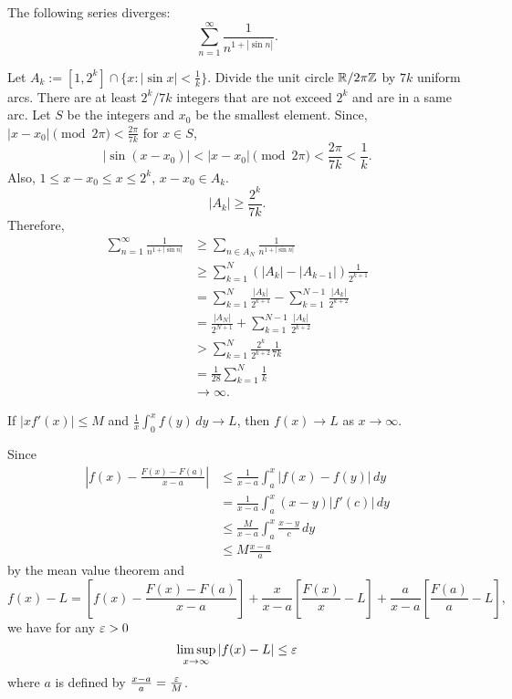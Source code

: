 \documentclass[12pt]{article}
\begin{document}
\begin{prb}
The following series diverges: \[\sum_{n=1}^\infty\frac1{n^{1+|\sin n|}}.\]
\end{prb}
\begin{sol}
Let $A_k:=[1,2^k]\cap\{x:|\sin x|<\frac1k\}$.
Divide the unit circle $\mathbb{R}/2\pi\mathbb{Z}$ by $7k$ uniform arcs.
There are at least $2^k/7k$ integers that are not exceed $2^k$ and are in a same arc.
Let $S$ be the integers and $x_0$ be the smallest element.
Since, $|x-x_0|\pmod{2\pi}<\frac{2\pi}{7k}$ for $x\in S$,
\[|\sin(x-x_0)|<|x-x_0|\pmod{2\pi}<\frac{2\pi}{7k}<\frac1k.\]
Also, $1\le x-x_0\le x\le2^k$, $x-x_0\in A_k$.
\[|A_k|\ge\frac{2^k}{7k}.\]
Therefore,
\begin{align*}
\sum_{n=1}^\infty\frac1{n^{1+|\sin n|}}
&\ge\sum_{n\in A_N}\frac1{n^{1+|\sin n|}}\\
&\ge\sum_{k=1}^N(|A_k|-|A_{k-1}|)\frac1{2^{k+1}}\\
&=\sum_{k=1}^N\frac{|A_k|}{2^{k+1}}-\sum_{k=1}^{N-1}\frac{|A_k|}{2^{k+2}}\\
&=\frac{|A_N|}{2^{N+1}}+\sum_{k=1}^{N-1}\frac{|A_k|}{2^{k+2}}\\
&>\sum_{k=1}^N\frac{2^k}{2^{k+2}}\frac1{7k}\\
&=\frac1{28}\sum_{k=1}^N\frac1k\\
&\to\infty.
\end{align*}
\end{sol}

\clearpage
\begin{prb}
If $|xf'(x)|\le M$ and $\frac1x\int_0^xf(y)\,dy\to L$, then $f(x)\to L$ as $x\to\infty$.
\end{prb}
\begin{sol}
Since
\begin{align*}
|f(x)-\frac{F(x)-F(a)}{x-a}|
&\le\frac1{x-a}\int_a^x|f(x)-f(y)|\,dy\\
&=\frac1{x-a}\int_a^x(x-y)|f'(c)|\,dy\\
&\le\frac M{x-a}\int_a^x\frac{x-y}c\,dy\\
&\le M\frac{x-a}a
\end{align*}
by the mean value theorem and 
\[f(x)-L=\left[f(x)-\frac{F(x)-F(a)}{x-a}\right]+\frac x{x-a}\left[\frac{F(x)}x-L\right]+\frac a{x-a}\left[\frac{F(a)}a-L\right],\]
we have for any $\varepsilon>0$
\[\limsup_{x\to\infty}|f(x)-L|\le\varepsilon\]
where $a$ is defined by $\frac{x-a}a=\frac{\varepsilon} M$.
\end{sol}
\end{document}
